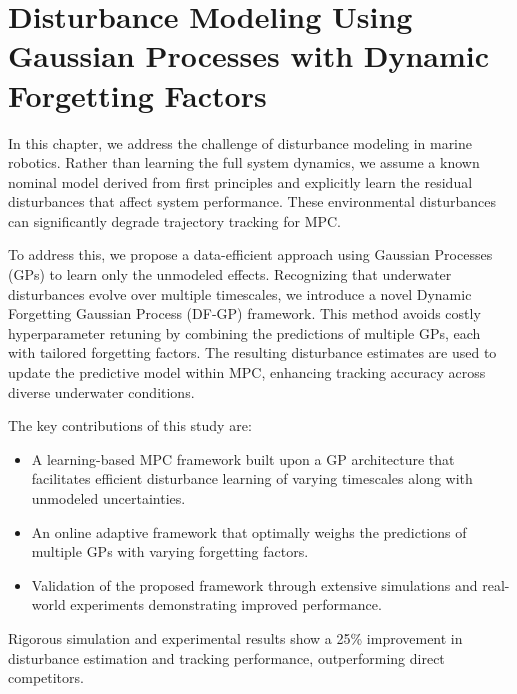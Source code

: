 \chapter{Disturbance Modeling Using Gaussian Processes with Dynamic Forgetting Factors}

In this chapter, we address the challenge of disturbance modeling in marine robotics. Rather than learning the full system dynamics, we assume a known nominal model derived from first principles and explicitly learn the residual disturbances that affect system performance. These environmental disturbances can significantly degrade trajectory tracking for MPC. 

To address this, we propose a data-efficient approach using Gaussian Processes (GPs) to learn only the unmodeled effects. Recognizing that underwater disturbances evolve over multiple timescales, we introduce a novel Dynamic Forgetting Gaussian Process (DF-GP) framework. This method avoids costly hyperparameter retuning by combining the predictions of multiple GPs, each with tailored forgetting factors. The resulting disturbance estimates are used to update the predictive model within MPC, enhancing tracking accuracy across diverse underwater conditions.




The key contributions of this study are:

\begin{itemize}
\item A learning-based MPC framework built upon a GP architecture that facilitates efficient disturbance learning of varying timescales along with unmodeled uncertainties.
\item An online adaptive framework that optimally weighs the predictions of multiple GPs with varying forgetting factors.
\item Validation of the proposed framework through extensive simulations and real-world experiments demonstrating improved performance.
\end{itemize}

Rigorous simulation and experimental results show a 25\% improvement in disturbance estimation and tracking performance, outperforming direct competitors.